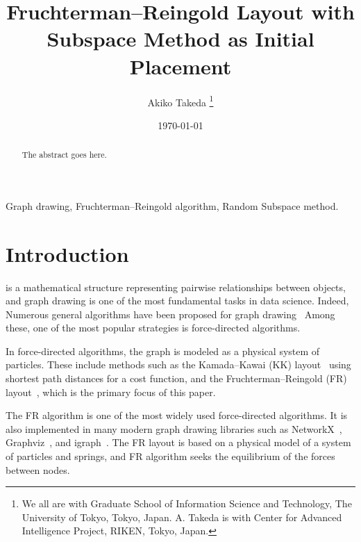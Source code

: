 \documentclass[dvipdfmx,journal]{IEEEtran}
\begin{document}

\title{Fruchterman--Reingold Layout with\\Subspace Method as Initial Placement}
\author{
  Akiko Takeda
  \thanks{
    We all are with Graduate School of Information Science and Technology, The University of Tokyo, Tokyo, Japan. A. Takeda is with Center for Advanced Intelligence Project, RIKEN, Tokyo, Japan.
  }
}
\date{\today}
\maketitle

\begin{abstract}
  The abstract goes here.
  \lipsum[1]
\end{abstract}

\begin{IEEEkeywords}
  Graph drawing, Fruchterman--Reingold algorithm, Random Subspace method.
\end{IEEEkeywords}

\section{Introduction}\label{sec:introduction}

 is a mathematical structure representing pairwise relationships between objects, and graph drawing is one of the most fundamental tasks in data science. Indeed, Numerous general algorithms have been proposed for graph drawing~\cite{tutteHowDrawGraph1963,chrobakLineartimeAlgorithmDrawing1995,sugiyamaMethodsVisualUnderstanding1981,ghassemitoosiSimulatedAnnealingPreProcessing2016}
Among these, one of the most popular strategies is force-directed algorithms.

In force-directed algorithms, the graph is modeled as a physical system of particles. These include methods such as the Kamada--Kawai (KK) layout~\cite{kamadaAlgorithmDrawingGeneral1989} using shortest path distances for a cost function, and the Fruchterman--Reingold (FR) layout~\cite{fruchtermanGraphDrawingForcedirected1991,kobourovSpringEmbeddersForce2012}, which is the primary focus of this paper.

The FR algorithm is one of the most widely used force-directed algorithms. It is also implemented in many modern graph drawing libraries such as NetworkX~\cite{osti_960616}, Graphviz~\cite{ellsonGraphvizOpenSource2002}, and igraph~\cite{csardiIgraphSoftwarePackage2006}. The FR layout is based on a physical model of a system of particles and springs, and FR algorithm seeks the equilibrium of the forces between nodes.
\end{document}

